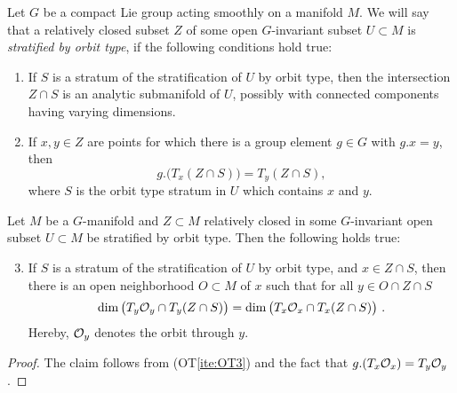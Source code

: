\begin{definition}
  Let $G$ be a compact Lie group acting smoothly on a manifold $M$. We will say that a relatively closed subset $Z$ 
  of some open $G$-invariant subset $U \subset M$ is \emph{stratified by orbit type}, if the following conditions 
  hold true:
  \begin{enumerate}[(OT1)]
  \item \label{ite:OT1} 
        If $S$ is a stratum of the stratification of $U$ by orbit type, then 
        the intersection $Z\cap S$ is an analytic submanifold of $U$, 
        possibly with  connected components having varying dimensions. 
  \item \label{ite:OT3} 
        If $x,y \in Z$ are points for which there is a group element $g\in G$ 
        with $g.x =y$,  then 
        \[
          g.\big( T_x (Z\cap S) \big) = T_y(Z\cap S) ,
        \] 
        where $S$ is the orbit type stratum in $U$ which contains $x$ and $y$.
  \end{enumerate}
\end{definition}

\begin{lemma}
Let $M$ be a $G$-manifold and $Z \subset M$ relatively closed  
in some $G$-invariant open subset $U\subset M$ be stratified by orbit type. 
Then the following holds true:
\begin{enumerate}[{\rm (OT1)}]
\setcounter{enumi}{2}
 \item \label{ite:OT2} 
        If $S$ is a stratum of the stratification of $U$ by orbit type, and $x \in Z\cap S$,
        then there is an open neighborhood $O\subset M$ of $x$ such that for all $y \in O\cap Z\cap S$
        \[
           \dim \big( T_y \mathcal{O}_y \cap  T_y(Z\cap S) \big) = \dim \big( T_x \mathcal{O}_x \cap  T_x(Z\cap S) \big) \ .
        \] 
        Hereby, $\mathcal{O}_y$ denotes the orbit through $y$. 
\end{enumerate}
\end{lemma}

\begin{proof}
  The claim follows from (OT\ref{ite:OT3}) and the fact that 
  $g.(T_x \mathcal{O}_x ) = T_y \mathcal{O}_y$.
\end{proof}


